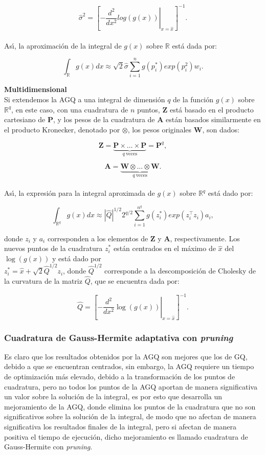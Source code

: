 \[
\hat{\sigma}^2={\left[\left. -\frac{d^2}{dx^2}log(g(x))\right|_{x=\hat{x}}\right]^{-1}}.
\]
\\
As\'{\i}, la aproximaci\'{o}n de la integral de $g(x)$ sobre $\mathbb{R}$ est\'{a} dada por:

\[
\int_{\mathbb{R}}{g(x)dx}\approx\sqrt{2}\hat{\sigma}\sum_{i=1}^{n}{g(p_i^*)exp(p_i^2)w_i.}
\]

\textbf{Multidimensional\\}
Si extendemos la AGQ a una integral de dimensi\'{o}n $q$ de la funci\'{o}n $g(x)$ sobre $\mathbb{R}^q$, en este caso, con una cuadratura de $n$ puntos, $\textbf{Z}$ est\'{a} basado en el producto cartesiano de $\textbf{P}$, y los pesos de la cuadratura de $\textbf{A}$ est\'{a}n basados similarmente en el producto Kronecker, denotado por $\otimes$, los pesos originales $\textbf{W}$, son dados:

\[
\textbf{Z}=\underbrace{\textbf{P} \times \ldots \times \textbf{P}}_{q\ \text{veces}}=\textbf{P}^q,
\]

\[
\textbf{A}=\underbrace{\textbf{W} \otimes \ldots \otimes \textbf{W}}_{q\ \text{veces}}.
\]
\\
As\'{\i}, la expresi\'{o}n para la integral aproximada de $g(x)$ sobre $\mathbb{R}^q$ est\'{a} dado por:

\begin{equation}
\int_{\mathbb{R}^q}{g(x)dx}\approx|\hat{Q}|^{1/2} 2^{q/2}\sum_{i=1}^{n^q}g(z_i^*)exp(z_i^{\top}z_i)a_i,
\label{EQ_ghmulti}
\end{equation}

donde $z_i$ y $a_i$ corresponden a los elementos de $\textbf{Z}$ y $\textbf{A}$, respectivamente. Los nuevos puntos de la cuadratura $z_i^*$ est\'{a}n centrados en el m\'{a}ximo de $\hat{x}$ del $\log(g(x))$ y est\'{a} dado por \\
$z_i^*=\hat{x}+\sqrt{2}\hat{Q}^{1/2}z_i$, donde $\hat{Q}^{1/2}$ corresponde a la descomposici\'{o}n de Cholesky de la curvatura de la matriz $\hat{Q}$, que se encuentra dada por:

\[
\hat{Q}={\left[\left. -\frac{d^2}{dx^2}\log(g(x))\right|_{x=\hat{x}}\right]^{-1}}.
\]

\subsubsection{Cuadratura de Gauss-Hermite adaptativa con \textit{pruning}}

Es claro que los resultados obtenidos por la AGQ son mejores que los de GQ, debido a que se encuentran centrados, sin embargo, la AGQ requiere un tiempo de optimizaci\'{o}n m\'{a}s elevado, debido a la transformaci\'{o}n de los puntos de cuadratura, pero no todos los puntos de la AGQ aportan de manera significativa un valor sobre la soluci\'{o}n de la integral, es por esto que \cite{Hernandez1} desarrolla un mejoramiento de la AGQ, donde elimina los puntos de la cuadratura que no son significativos sobre la soluci\'{o}n de la integral, de modo que no afectan de manera significativa los resultados finales de la integral, pero si afectan de manera positiva el tiempo de ejecuci\'{o}n, dicho mejoramiento es llamado cuadratura de Gauss-Hermite con \textit{pruning}.\\

